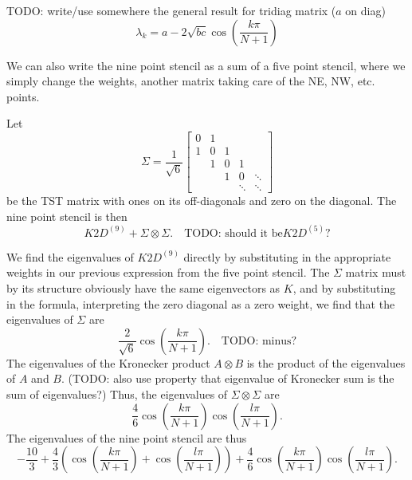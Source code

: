 TODO: write/use somewhere the general result for tridiag matrix ($a$ on diag)
\begin{equation*}
	\lambda_k = a - 2 \sqrt{bc} \cos(\frac{k \pi}{N + 1})
\end{equation*}

We can also write the nine point stencil as a sum of a five point stencil, where we simply change the weights, another matrix taking care of the NE, NW, etc. points.

Let
\begin{equation}
  \Sigma =
  \frac{1}{\sqrt{6}}
  \begin{bmatrix}
    0 & 1  \\
    1 & 0 & 1 \\
      & 1 & 0 & 1 \\
      &   & 1 & 0 & \ddots\\
      &   &   & \ddots  & \ddots
  \end{bmatrix}
\end{equation}
be the TST matrix with ones on its off-diagonals and zero on the diagonal.
The nine point stencil is then
\begin{equation}
  K2D^{(9)} + \Sigma \otimes \Sigma. \quad \text{TODO: should it be} K2D^{(5)}?
\end{equation}

We find the eigenvalues of $K2D^{(9)}$ directly by substituting in the appropriate weights in our previous expression from the five point stencil.
The $\Sigma$ matrix must by its structure obviously have the same eigenvectors as $K$, and by substituting in the formula, interpreting the zero diagonal as a zero weight, we find that the eigenvalues of $\Sigma$ are
$$
\frac{2}{\sqrt{6}} \cos(\frac{k \pi}{N+1}).
\quad \text{TODO: minus?}
$$
The eigenvalues of the Kronecker product $A \otimes B$ is the product of the eigenvalues of $A$ and $B$.
(TODO: also use property that eigenvalue of Kronecker sum is the sum of eigenvalues?)
Thus, the eigenvalues of $\Sigma \otimes \Sigma$ are
$$
\frac46
\cos(\frac{k \pi}{N+1})
\cos(\frac{l \pi}{N+1}).
$$
The eigenvalues of the nine point stencil are thus
\begin{equation}
  -\frac{10}{3}
  + \frac43
  \left(
  \cos(\frac{k \pi}{N+1})
  + \cos(\frac{l \pi}{N+1})
  \right)
  +
  \frac46
  \cos(\frac{k \pi}{N+1})
  \cos(\frac{l \pi}{N+1}).
\end{equation}

\newcommand{\inorm}[1]{
\lVert #1 \rVert_\infty
}


